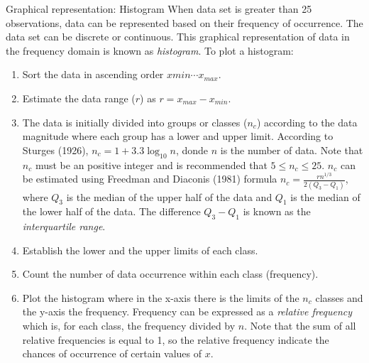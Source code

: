 \documentclass[8pt]{beamer}
\begin{document}
\begin{frame}{Graphical representation: Histogram}
        When data set is greater than 25 observations, data can be represented based on their frequency of occurrence. The data set can be discrete or continuous. This graphical representation of data in the frequency domain is known as \emph{histogram}. To plot a histogram:
        \begin{enumerate}
            \item Sort the data in ascending order $x{min}\cdots x_{max}$.
            \item Estimate the data range ($r$) as $r = x_{max} - x_{min} $.
            \item The data is initially divided  into groups or classes ($n_c$) according to the data magnitude where each group has a lower and upper limit.  According to Sturges (1926), $n_c = 1 + 3.3 \log_10 n $, donde $n$ is the number of data. Note that $n_c$ must be an positive integer and is recommended that $5 \le n_c \le 25$. $n_c$ can be estimated using Freedman and Diaconis (1981) formula  $n_c = \frac{r n^{1/3}}{2\left(Q_3 - Q_1\right)}$, where $Q_3$ is the median of the upper half of the data and $Q_1$ is the median of the lower half of the data. The difference $Q_3 - Q_1$ is known as the \emph{interquartile range}.
            \item Establish the lower and the upper limits of each class.
            \item Count the number of data occurrence within each class (frequency).
            \item Plot the histogram where in the x-axis there is the limits of the $n_c$ classes and the y-axis the frequency. Frequency can be expressed as a \emph{relative frequency} which is, for each class, the frequency divided by $n$. Note that the sum of all relative frequencies is equal to 1, so the relative frequency indicate the chances of occurrence of certain values of $x$.
\end{enumerate}
\end{frame}
\end{document}
